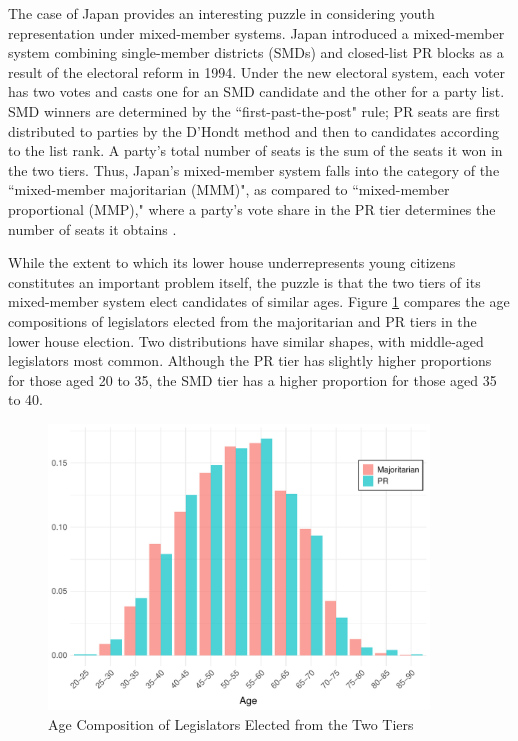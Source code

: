 \documentclass[a4paper, 11pt]{article}
\begin{document}
The case of Japan provides an interesting puzzle in considering youth representation under mixed-member systems. Japan introduced a mixed-member system combining single-member districts (SMDs) and closed-list PR blocks as a result of the electoral reform in 1994. Under the new electoral system, each voter has two votes and casts one for an SMD candidate and the other for a party list. SMD winners are determined by the ``first-past-the-post" rule; PR seats are first distributed to parties by the D'Hondt method and then to candidates according to the list rank. A party's total number of seats is the sum of the seats it won in the two tiers. Thus, Japan's mixed-member system falls into the category of the ``mixed-member majoritarian (MMM)", as compared to ``mixed-member proportional (MMP)," where a party's vote share in the PR tier determines the number of seats it obtains \citep{shugart_mixed-member_2003}. 

While the extent to which its lower house underrepresents young citizens constitutes an important problem itself, the puzzle is that the two tiers of its mixed-member system elect candidates of similar ages. Figure \ref{fig:pr_vs_smd} compares the age compositions of legislators elected from the majoritarian and PR tiers in the lower house election. Two distributions have similar shapes, with middle-aged legislators most common. Although the PR tier has slightly higher proportions for those aged 20 to 35, the SMD tier has a higher proportion for those aged 35 to 40. 

\begin{figure}[!htbp]
	\includegraphics[width = 0.9\textwidth]{../figure/paper/age_smd_vs_pr_winners.pdf}
	\caption{Age Composition of Legislators Elected from the Two Tiers}
	\label{fig:pr_vs_smd}
\end{figure}
\end{document}
